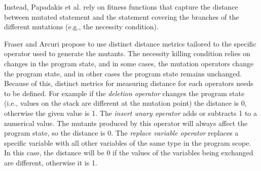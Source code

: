 Instead, Papadakis et al. \cite{papadakis2011automatically} rely on fitness functions that capture the distance between mutated statement and the statement covering the branches of the different mutations (e.g., the necessity condition).

Fraser and Arcuri \cite{fraser2015achieving} propose to use distinct distance metrics tailored to the specific operator used to generate the mutants.
The necessity killing condition relies on changes in the program state, and in some cases, the mutation operators change the program state, and in other cases the program state remains unchanged. Because of this, distinct metrics for measuring distance for each operators needs to be defined.
For example if the \textit{deletion operator} changes the program state (i.e., values on the stack are different at the mutation point) the distance is 0, otherwise the given value is 1. 
The \textit{insert unary operator} adds or subtracts 1 to a numerical value. The mutants produced by this operator will always affect the program state, so the distance is 0.
The \textit{replace variable operator} replaces a specific variable with all other variables of the same type in the program scope. In this case, the distance will be 0 if the values of the variables being exchanged are different, otherwise it is 1.

\endinput

\subsubsection{Symbolic execution test generation} %

\begin{itemize}

	\item Dynamic symbolic execution approaches: embed the mutant killing conditions within the executable program and guide test generation towards these conditions.

	\item Papadakis et al. \cite{papadakis2011automatically, papadakis2010towards}:
	Embed mutant infection conditions (cause a corruption to the program state) within the schematic functions that are produced by mutant schemata. Basically, we have all mutants encoded in a single executable with their killing conditions. Then, using dynamic symbolic execution we can directly produce test cases that targets those infection conditions.
\end{itemize}


